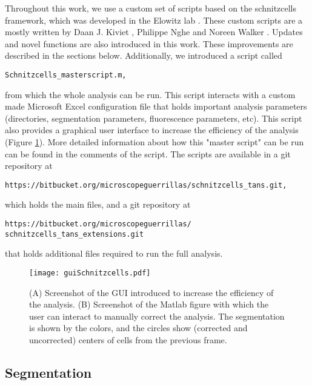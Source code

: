 Throughout this work, we use a custom set of scripts based on the schnitzcells framework, which was developed in the Elowitz lab \cite{Young2012}. 
These custom scripts are a mostly written by Daan J. Kiviet \cite{Kiviet2010}, Philippe Nghe and Noreen Walker \cite{Walker2016t}.
Updates and novel functions are also introduced in this work.
These improvements are described in the sections below.
Additionally, we introduced a script called
\begin{verbatim}
Schnitzcells_masterscript.m,
\end{verbatim}
from which the whole analysis can be run. 
This script interacts with a custom made Microsoft Excel configuration file that holds important analysis parameters (directories, segmentation parameters, fluorescence parameters, etc).
This script also provides a graphical user interface to increase the efficiency of the analysis (Figure \ref{fig:mm:GUI}).
More detailed information about how this "master script" can be run can be found in the comments of the script.
The scripts are available in a git repository at 
\begin{verbatim}
https://bitbucket.org/microscopeguerrillas/schnitzcells_tans.git,
\end{verbatim}
which holds the main files, 
and a git repository at
\begin{verbatim}
https://bitbucket.org/microscopeguerrillas/
schnitzcells_tans_extensions.git
\end{verbatim}
that holds additional files required to run the full analysis.


\begin{figure}
	\centering
	\texttt{[image: guiSchnitzcells.pdf]}
	\caption{ 
		(A) Screenshot of the GUI introduced to increase the efficiency of the analysis.
		(B) Screenshot of the Matlab figure with which the user can interact to manually correct the analysis. The segmentation is shown by the colors, and the circles show (corrected and uncorrected) centers of cells from the previous frame.
	}
	\label{fig:mm:GUI}
\end{figure}

\subsection{Segmentation}

